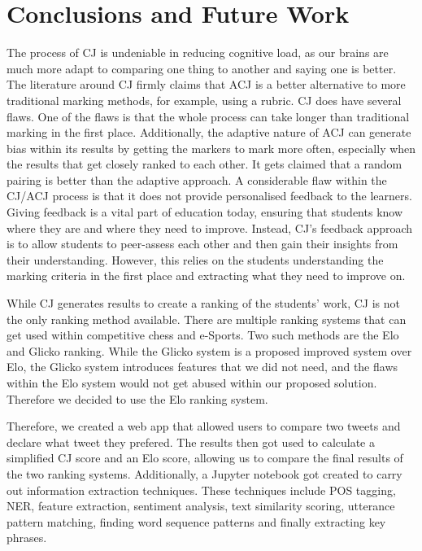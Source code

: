 \chapter{Conclusions and Future Work}
\label{chap:conclusion}


The process of CJ is undeniable in reducing cognitive load, as our brains are much more adapt to comparing one thing to another and saying one is better. The literature around CJ firmly claims that ACJ is a better alternative to more traditional marking methods, for example, using a rubric. CJ does have several flaws. One of the flaws is that the whole process can take longer than traditional marking in the first place. Additionally, the adaptive nature of ACJ can generate bias within its results by getting the markers to mark more often, especially when the results that get closely ranked to each other. It gets claimed that a random pairing is better than the adaptive approach. A considerable flaw within the CJ/ACJ process is that it does not provide personalised feedback to the learners. Giving feedback is a vital part of education today, ensuring that students know where they are and where they need to improve. Instead, CJ's feedback approach is to allow students to peer-assess each other and then gain their insights from their understanding. However, this relies on the students understanding the marking criteria in the first place and extracting what they need to improve on.

While CJ generates results to create a ranking of the students' work, CJ is not the only ranking method available. There are multiple ranking systems that can get used within competitive chess and e-Sports. Two such methods are the Elo and Glicko ranking. While the Glicko system is a proposed improved system over Elo, the Glicko system introduces features that we did not need, and the flaws within the Elo system would not get abused within our proposed solution. Therefore we decided to use the Elo ranking system.

Therefore, we created a web app that allowed users to compare two tweets and declare what tweet they prefered. The results then got used to calculate a simplified CJ score and an Elo score, allowing us to compare the final results of the two ranking systems. Additionally, a Jupyter notebook got created to carry out information extraction techniques. These techniques include POS tagging, NER, feature extraction, sentiment analysis, text similarity scoring, utterance pattern matching, finding word sequence patterns and finally extracting key phrases.

